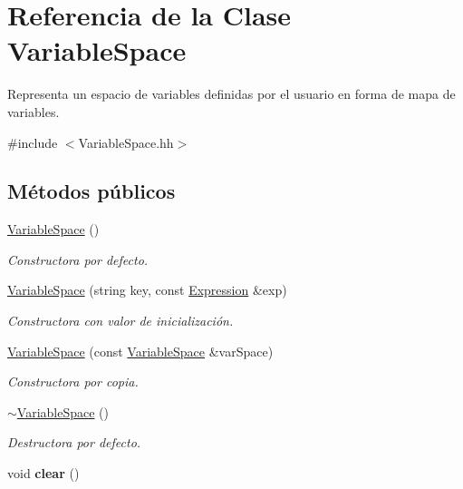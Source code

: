 \hypertarget{class_variable_space}{}\section{Referencia de la Clase Variable\+Space}
\label{class_variable_space}


Representa un espacio de variables definidas por el usuario en forma de mapa de variables.  




{\ttfamily \#include $<$Variable\+Space.\+hh$>$}

\subsection*{Métodos públicos}
\begin{DoxyCompactItemize}
\item 
\hyperlink{class_variable_space_aa5cc75308d063873297bc15dbb3df9b0}{Variable\+Space} ()
\begin{DoxyCompactList}\small\item\em Constructora por defecto. \end{DoxyCompactList}\item 
\hyperlink{class_variable_space_add8e9672f166125237ae41e58bb80c2c}{Variable\+Space} (string key, const \hyperlink{class_expression}{Expression} \&exp)
\begin{DoxyCompactList}\small\item\em Constructora con valor de inicialización. \end{DoxyCompactList}\item 
\hyperlink{class_variable_space_a61593b2566ddf90eb391bfad68c1caf0}{Variable\+Space} (const \hyperlink{class_variable_space}{Variable\+Space} \&var\+Space)
\begin{DoxyCompactList}\small\item\em Constructora por copia. \end{DoxyCompactList}\item 
\hyperlink{class_variable_space_aa84c24cfe3aff34d73704b52e3860210}{$\sim$\+Variable\+Space} ()
\begin{DoxyCompactList}\small\item\em Destructora por defecto. \end{DoxyCompactList}\item 
void {\bfseries clear} ()\hypertarget{class_variable_space_a8fa500a305d3931fa4bbfb3f53eea771}{}\label{class_variable_space_a8fa500a305d3931fa4bbfb3f53eea771}


\end{DoxyCompactItemize}
